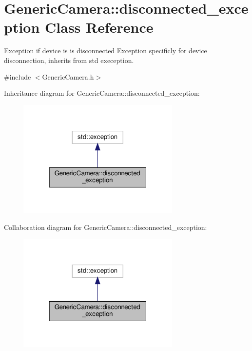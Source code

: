 \hypertarget{classGenericCamera_1_1disconnected__exception}{}\section{Generic\+Camera\+:\+:disconnected\+\_\+exception Class Reference}
\label{classGenericCamera_1_1disconnected__exception}


Exception if device is is disconnected Exception specificly for device disconnection, inherits from std exeception.  




{\ttfamily \#include $<$Generic\+Camera.\+h$>$}



Inheritance diagram for Generic\+Camera\+:\+:disconnected\+\_\+exception\+:\nopagebreak
\begin{figure}[H]
\begin{center}
\leavevmode
\includegraphics[width=229pt]{classGenericCamera_1_1disconnected__exception__inherit__graph}
\end{center}
\end{figure}


Collaboration diagram for Generic\+Camera\+:\+:disconnected\+\_\+exception\+:\nopagebreak
\begin{figure}[H]
\begin{center}
\leavevmode
\includegraphics[width=229pt]{classGenericCamera_1_1disconnected__exception__coll__graph}
\end{center}
\end{figure}
